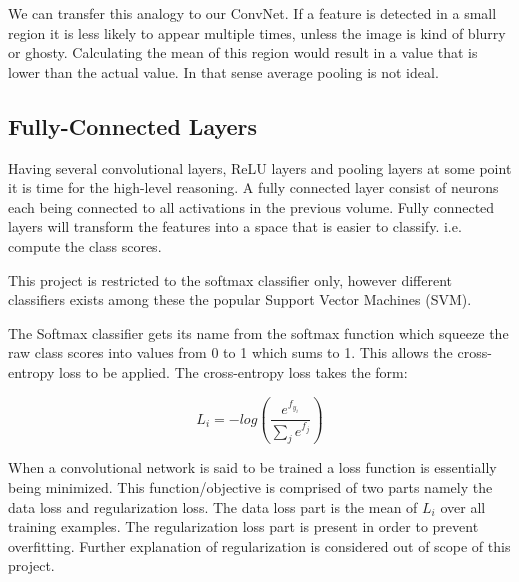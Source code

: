 We can transfer this analogy to our ConvNet. If a feature is detected in a small
region it is less likely to appear multiple times, unless the image is kind of
blurry or ghosty. Calculating the mean of this region would result in a value
that is lower than the actual value. In that sense average pooling is not ideal.

\subsection{Fully-Connected Layers} %
\label{sub:fc_layers}

Having several convolutional layers, ReLU layers and pooling layers at some
point it is time for the high-level reasoning. A fully connected layer consist of neurons each being connected to all activations in the previous volume. Fully connected layers will transform the features into a space that is easier to classify. i.e. compute the class scores.

This project is restricted to the softmax classifier only, however different classifiers exists among these the popular Support Vector Machines (SVM).

The Softmax classifier gets its name from the softmax function which squeeze the raw class scores into values from 0 to 1 which sums to 1. This allows the cross-entropy loss to be applied. The cross-entropy loss takes the form:

$$ L_i = -log\left(\frac{e^{f_{y_i}}}{\sum_{j}{e^{f_j}}}\right)$$

When a convolutional network is said to be trained a loss function is essentially being minimized. This function/objective is comprised of two parts namely the data loss and regularization loss. The data loss part is the mean of $L_i$ over all training examples. The regularization loss part is present in order to prevent overfitting. Further explanation of regularization is considered out of scope of this project.


